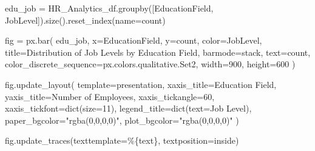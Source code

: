 \documentclass[
  letterpaper,
  DIV=11,
  numbers=noendperiod]{scrartcl}
\newenvironment{Shaded}{\begin{snugshade}}{\end{snugshade}}
\newcommand{\BuiltInTok}[1]{\textcolor[rgb]{0.00,0.23,0.31}{#1}}
\newcommand{\DecValTok}[1]{\textcolor[rgb]{0.68,0.00,0.00}{#1}}
\newcommand{\NormalTok}[1]{\textcolor[rgb]{0.00,0.23,0.31}{#1}}
\newcommand{\OperatorTok}[1]{\textcolor[rgb]{0.37,0.37,0.37}{#1}}
\newcommand{\SpecialCharTok}[1]{\textcolor[rgb]{0.37,0.37,0.37}{#1}}
\newcommand{\StringTok}[1]{\textcolor[rgb]{0.13,0.47,0.30}{#1}}
\begin{document}
\begin{Shaded}
\begin{Highlighting}[]
\NormalTok{edu\_job }\OperatorTok{=}\NormalTok{ HR\_Analytics\_df.groupby([}\StringTok{\textquotesingle{}EducationField\textquotesingle{}}\NormalTok{, }\StringTok{\textquotesingle{}JobLevel\textquotesingle{}}\NormalTok{]).size().reset\_index(name}\OperatorTok{=}\StringTok{\textquotesingle{}count\textquotesingle{}}\NormalTok{)}

\NormalTok{fig }\OperatorTok{=}\NormalTok{ px.bar(}
\NormalTok{    edu\_job,}
\NormalTok{    x}\OperatorTok{=}\StringTok{\textquotesingle{}EducationField\textquotesingle{}}\NormalTok{,}
\NormalTok{    y}\OperatorTok{=}\StringTok{\textquotesingle{}count\textquotesingle{}}\NormalTok{,}
\NormalTok{    color}\OperatorTok{=}\StringTok{\textquotesingle{}JobLevel\textquotesingle{}}\NormalTok{,}
\NormalTok{    title}\OperatorTok{=}\StringTok{\textquotesingle{}Distribution of Job Levels by Education Field\textquotesingle{}}\NormalTok{,}
\NormalTok{    barmode}\OperatorTok{=}\StringTok{\textquotesingle{}stack\textquotesingle{}}\NormalTok{,}
\NormalTok{    text}\OperatorTok{=}\StringTok{\textquotesingle{}count\textquotesingle{}}\NormalTok{,}
\NormalTok{    color\_discrete\_sequence}\OperatorTok{=}\NormalTok{px.colors.qualitative.Set2,  }
\NormalTok{    width}\OperatorTok{=}\DecValTok{900}\NormalTok{,     }
\NormalTok{    height}\OperatorTok{=}\DecValTok{600}     
\NormalTok{)}

\NormalTok{fig.update\_layout(}
\NormalTok{    template}\OperatorTok{=}\StringTok{\textquotesingle{}presentation\textquotesingle{}}\NormalTok{,}
\NormalTok{    xaxis\_title}\OperatorTok{=}\StringTok{\textquotesingle{}Education Field\textquotesingle{}}\NormalTok{,}
\NormalTok{    yaxis\_title}\OperatorTok{=}\StringTok{\textquotesingle{}Number of Employees\textquotesingle{}}\NormalTok{,}
\NormalTok{    xaxis\_tickangle}\OperatorTok{=}\DecValTok{60}\NormalTok{,             }
\NormalTok{    xaxis\_tickfont}\OperatorTok{=}\BuiltInTok{dict}\NormalTok{(size}\OperatorTok{=}\DecValTok{11}\NormalTok{),   }
\NormalTok{    legend\_title}\OperatorTok{=}\BuiltInTok{dict}\NormalTok{(text}\OperatorTok{=}\StringTok{\textquotesingle{}Job Level\textquotesingle{}}\NormalTok{),}
\NormalTok{    paper\_bgcolor}\OperatorTok{=}\StringTok{"rgba(0,0,0,0)"}\NormalTok{,}
\NormalTok{    plot\_bgcolor}\OperatorTok{=}\StringTok{"rgba(0,0,0,0)"}
\NormalTok{)}

\NormalTok{fig.update\_traces(texttemplate}\OperatorTok{=}\StringTok{\textquotesingle{}\%}\SpecialCharTok{\{text\}}\StringTok{\textquotesingle{}}\NormalTok{, textposition}\OperatorTok{=}\StringTok{\textquotesingle{}inside\textquotesingle{}}\NormalTok{)}


\end{Highlighting}
\end{Shaded}
\end{document}
